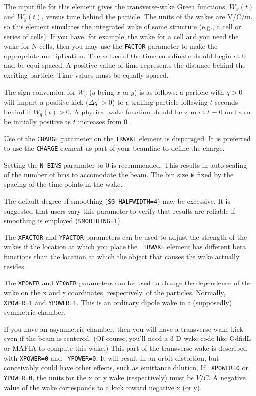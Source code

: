 The input file for this element gives the transverse-wake Green
functions, $W_x(t)$ and $W_y(t)$, versus time behind the particle. The
units of the wakes are V/C/m, so this element simulates the integrated
wake of some structure (e.g., a cell or series of cells).  If you
have, for example, the wake for a cell and you need the wake for N
cells, then you may use the {\tt FACTOR} parameter to make the
appropriate multiplication.  The values of the time coordinate should
begin at 0 and be equi-spaced.  A positive value of time represents
the distance behind the exciting particle.   Time values must be equally
spaced.

The sign convention for $W_q$ ($q$ being $x$ or $y$) is as follows: a
particle with $q>0$ will impart a positive kick ($\Delta q^\prime >
0$) to a trailing particle following $t$ seconds behind if $W_q(t)>0$.
A physical wake function should be zero at $t=0$ and also be initially
positive as $t$ increases from 0.

Use of the {\tt CHARGE} parameter on the {\tt TRWAKE} element is
disparaged.  It is preferred to use the {\tt CHARGE} element as part
of your beamline to define the charge.  

Setting the {\tt N\_BINS} paramater to 0 is recommended.  This results
in auto-scaling of the number of bins to accomodate the beam.  The bin
size is fixed by the spacing of the time points in the wake.

The default degree of smoothing ({\tt SG\_HALFWIDTH=4}) may be excessive.
It is suggested that users vary this parameter to verify that results
are reliable if smoothing is employed ({\tt SMOOTHING=1}).

The {\tt XFACTOR} and {\tt YFACTOR} parameters can be used to adjust
the strength of the wakes if the location at which you place the {\tt
TRWAKE} element has different beta functions than the location at
which the object that causes the wake actually resides.  

The {\tt XPOWER} and {\tt YPOWER} parameters can be used to change the
dependence of the wake on the x and y coordinates, respectively, of
the particles.  Normally, {\tt XPOWER=1} and {\tt YPOWER=1}.  This is
an ordinary dipole wake in a (supposedly) symmetric chamber.  

If you have an asymmetric chamber, then you will have a transverse
wake kick even if the beam is centered.  (Of course, you'll need a 3-D
wake code like GdfidL or MAFIA to compute this wake.)  This part of
the transverse wake is described with {\tt XPOWER=0} and {\tt
YPOWER=0}.  It will result in an orbit distortion, but conceivably
could have other effects, such as emittance dilution.  If {\tt
XPOWER=0} or {\tt YPOWER=0}, the units for the x or y wake
(respectively) must be $V/C$.  A negative value of the wake
corresponds to a kick toward negative x (or y).
